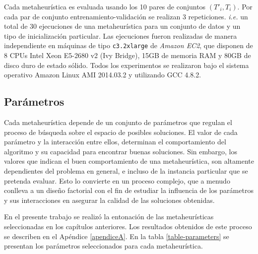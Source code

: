 Cada metaheurística es evaluada usando los 10 pares de conjuntos $(T'_i, T_i)$. Por cada par de conjunto entrenamiento-validación se realizan 3 repeticiones. \emph{i.e.} un total de 30 ejecuciones de una metaheurística para un conjunto de datos y un tipo de inicialización particular. Las ejecuciones fueron realizadas de manera independiente en máquinas de tipo \texttt{c3.2xlarge} de \emph{Amazon EC2}, que disponen de 8 CPUs Intel Xeon E5-2680 v2 (Ivy Bridge), 15GB de memoria RAM y 80GB de disco duro de estado sólido. Todos los experimentos se realizaron bajo el sistema operativo Amazon Linux AMI 2014.03.2 y utilizando GCC 4.8.2.

\subsection{Parámetros}
\label{sec-parametros}

Cada metaheurística depende de un conjunto de parámetros que regulan el proceso de búsqueda sobre el espacio de posibles soluciones. El valor de cada parámetro y la interacción entre ellos, determinan el comportamiento del algoritmo y su capacidad para encontrar buenas soluciones. Sin embargo, los valores que indican el buen comportamiento de una metaheurística, son altamente dependientes del problema en general, e incluso de la instancia particular que se pretenda evaluar. Esto lo convierte en un proceso complejo, que a menudo conlleva a un diseño factorial con el fin de estudiar la influencia de los parámetros y sus interacciones en asegurar la calidad de las soluciones obtenidas.

En el presente trabajo se realizó la entonación de las metaheurísticas seleccionadas en los capítulos anteriores. Los resultados obtenidos de este proceso se describen en el Apéndice \ref{apendiceA}. En la tabla \ref{table-parameters} se presentan los parámetros seleccionados para cada metaheurística.

